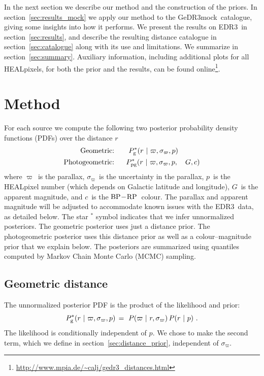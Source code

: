 \documentclass[twocolumn]{aastex62}
\providecommand{\given}{\ensuremath{\hspace{0.05em}\mid\hspace{0.05em}}}
\providecommand{\given}{\ensuremath{\hspace{0.01em}\mid\hspace{0.01em}}}
\providecommand{\mock}{GeDR3mock}
\providecommand{\release}{EDR3}
\providecommand{\gmag}{\ensuremath{G}}
\providecommand{\bprp}{\ensuremath{{\rm BP} \! - \! {\rm RP}}}
\providecommand{\cc}{\ensuremath{c}}
\providecommand{\parallax}{\ensuremath{\varpi}}
\providecommand{\sigparallax}{\ensuremath{\sigma_{\varpi}}}
\providecommand{\hp}{\ensuremath{p}}
\providecommand{\dist}{\ensuremath{r}}
\begin{document}
In the next section we describe our method and the construction of the priors.
In section~\ref{sec:results_mock} we apply our method to the \mock\ catalogue, giving some insights into how it performs. We present the results on \release\ in section~\ref{sec:results}, and 
describe the resulting distance catalogue in section~\ref{sec:catalogue} along with its use and limitations. We
summarize in section~\ref{sec:summary}.
Auxiliary information, including additional plots for all HEALpixels, for both the prior and the results, can be found online\footnote{\url{http://www.mpia.de/~calj/gedr3_distances.html}}.


\vspace*{1em}
\section{Method}\label{sec:method}

For each source we compute the following two posterior probability density functions (PDFs) over the distance \dist
\begin{alignat}{4}
\textrm{Geometric:} \ \ && P_{\rm g}^*(\dist \given \parallax, \sigparallax, \hp) && \nonumber \\
\textrm{Photogeometric:} \ \ && P_{\rm pg}^*(\dist \given \parallax, \sigparallax, \hp, \, && \gmag, \cc) \nonumber
\end{alignat}
where \parallax\ is the parallax,
\sigparallax\ is the uncertainty in the parallax,
\hp\ is the HEALpixel number (which depends on Galactic latitude and longitude),
\gmag\ is the apparent magnitude, and
\cc\ is the \bprp\ colour.
The parallax and apparent magnitude will be adjusted to accommodate known issues with the \release\ data, as detailed below. 
The star $^*$ symbol indicates that we infer unnormalized posteriors.
The geometric posterior uses just a distance prior. 
The photogeometric posterior uses this distance prior as well as a colour--magnitude prior that we explain below.
The posteriors are summarized using quantiles computed by Markov Chain Monte Carlo (MCMC) sampling.


\subsection{Geometric distance}

The unnormalized posterior PDF is the product of the likelihood and prior:
\begin{equation}
  P_{\rm g}^*(\dist \given \parallax, \sigparallax, \hp) \,=\  P(\parallax \given \dist, \sigparallax) \, P(\dist \given \hp) \ .
  \label{eqn:distpost_geo}
\end{equation}
The likelihood is conditionally independent of \hp.
We chose to make the second term, which we define in section~\ref{sec:distance_prior}, independent of \sigparallax.
\end{document}
